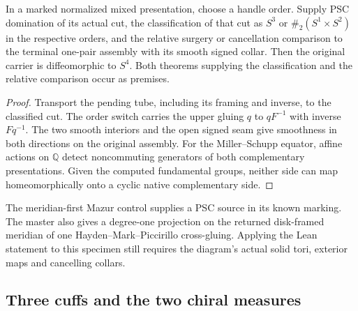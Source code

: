 \begin{proposition}
\label{prop:ed07-native-recognition}
\leanok
In a marked normalized mixed presentation, choose a handle order.
Supply PSC domination of its actual cut, the classification of that cut
as $S^3$ or $\#_2(S^1\times S^2)$ in the respective orders, and the
relative surgery or cancellation comparison to the terminal one-pair
assembly with its smooth signed collar. Then the original carrier
is diffeomorphic to $S^4$. Both theorems supplying the classification
and the relative comparison occur as premises.
\end{proposition}
\begin{proof}
\leanok
Transport the pending tube, including its framing and inverse, to the
classified cut. The order switch carries the upper gluing $q$ to
$qF^{-1}$ with inverse $Fq^{-1}$. The two smooth interiors and the
open signed seam give smoothness in both directions on the original
assembly. For the Miller--Schupp equator, affine actions on
$\mathbb Q$ detect noncommuting generators of both complementary
presentations. Given the computed fundamental groups, neither side
can map homeomorphically onto a cyclic native complementary side.
\end{proof}

The meridian-first Mazur control supplies a PSC source in its known
marking. The master also gives a degree-one projection on the returned
disk-framed meridian of one Hayden--Mark--Piccirillo cross-gluing.
Applying the Lean statement to this specimen still requires the
diagram's actual solid tori, exterior maps and cancelling collars.

\subsection{Three cuffs and the two chiral measures}

